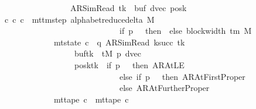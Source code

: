 \begin{isabellebody}
\ \ \ \ \ \ \ \ \ \ \ \ \ \ \ \ \ \ \ {\isacharparenleft}{\kern0pt}AR{\isacharunderscore}{\kern0pt}SimRead{\isacharcomma}{\kern0pt}\ tk{\isacharcomma}{\kern0pt}\ {}{\isacharcomma}{\kern0pt}\ buf{\isacharcomma}{\kern0pt}\ dvec{\isacharcomma}{\kern0pt}\ posk{\isacharparenright}{\kern0pt}{\isachardoublequoteclose}\isanewline
\ \ \ {\isachardoublequoteopen}{\isasymexists}c{\isacharprime}{\kern0pt}{\isacharprime}{\kern0pt}{\isachardot}{\kern0pt}\ {\isacharparenleft}{\kern0pt}c{\isacharprime}{\kern0pt}{\isacharcomma}{\kern0pt}\ c{\isacharprime}{\kern0pt}{\isacharprime}{\kern0pt}{\isacharparenright}{\kern0pt}\ {\isasymin}\ {\isacharparenleft}{\kern0pt}mttm{\isacharunderscore}{\kern0pt}step\ {\isacharparenleft}{\kern0pt}alphabet{\isacharunderscore}{\kern0pt}reduce{\isacharunderscore}{\kern0pt}delta\ M{\isacharparenright}{\kern0pt}{\isacharparenright}{\kern0pt}\isanewline
\ \ \ \ \ \ \ \ \ \ \ \ \ \ \ \ \ \ \ \ \ \ \ \ \ \ \ \ \ \ {\isacharcircum}{\kern0pt}{\isacharcircum}{\kern0pt}\ {\isacharparenleft}{\kern0pt}if\ p\ {\isacharequal}{\kern0pt}\ {}\ then\ {}\ else\ block{\isacharunderscore}{\kern0pt}width\ {\isacharparenleft}{\kern0pt}{\isasymGamma}{\isacharunderscore}{\kern0pt}tm\ M{\isacharparenright}{\kern0pt}\ {\isacharplus}{\kern0pt}\ {}{\isacharparenright}{\kern0pt}\isanewline
\ \ \ \ \ \ \ \ \ \ \ \ \ \ {\isasymand}\ mt{\isacharunderscore}{\kern0pt}state\ c{\isacharprime}{\kern0pt}{\isacharprime}{\kern0pt}\ {\isacharequal}{\kern0pt}\ {\isacharparenleft}{\kern0pt}q{\isacharcomma}{\kern0pt}\ AR{\isacharunderscore}{\kern0pt}SimRead{\isacharcomma}{\kern0pt}\ k{\isacharunderscore}{\kern0pt}succ\ tk{\isacharcomma}{\kern0pt}\ {}{\isacharcomma}{\kern0pt}\isanewline
\ \ \ \ \ \ \ \ \ \ \ \ \ \ \ \ \ \ \ \ buf{\isacharparenleft}{\kern0pt}tk\ {\isacharcolon}{\kern0pt}{\isacharequal}{\kern0pt}\ tM\ p{\isacharparenright}{\kern0pt}{\isacharcomma}{\kern0pt}\ dvec{\isacharcomma}{\kern0pt}\isanewline
\ \ \ \ \ \ \ \ \ \ \ \ \ \ \ \ \ \ \ \ posk{\isacharparenleft}{\kern0pt}tk\ {\isacharcolon}{\kern0pt}{\isacharequal}{\kern0pt}\ if\ p\ {\isacharequal}{\kern0pt}\ {}\ then\ AR{\isacharunderscore}{\kern0pt}AtLE\isanewline
\ \ \ \ \ \ \ \ \ \ \ \ \ \ \ \ \ \ \ \ \ \ \ \ \ \ \ \ \ \ \ else\ if\ p\ {\isacharequal}{\kern0pt}\ {}\ then\ AR{\isacharunderscore}{\kern0pt}AtFirstProper\isanewline
\ \ \ \ \ \ \ \ \ \ \ \ \ \ \ \ \ \ \ \ \ \ \ \ \ \ \ \ \ \ \ else\ AR{\isacharunderscore}{\kern0pt}AtFurtherProper{\isacharparenright}{\kern0pt}{\isacharparenright}{\kern0pt}\isanewline
\ \ \ \ \ \ \ \ \ \ \ \ \ \ {\isasymand}\ mt{\isacharunderscore}{\kern0pt}tape\ c{\isacharprime}{\kern0pt}{\isacharprime}{\kern0pt}\ {\isacharequal}{\kern0pt}\ mt{\isacharunderscore}{\kern0pt}tape\ c{\isacharprime}{\kern0pt}\isanewline

\end{isabellebody}
